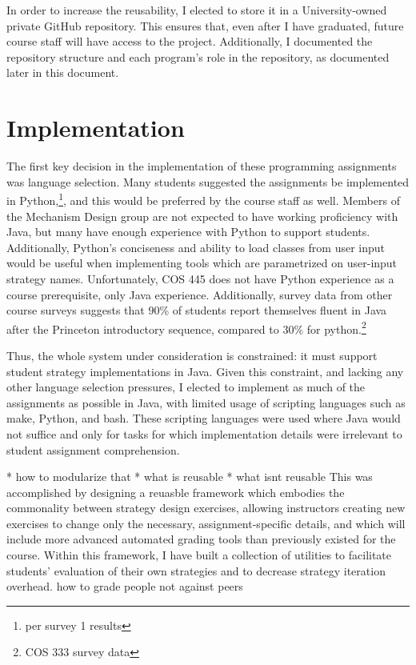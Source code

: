 \documentclass[pageno]{jpaper}
\begin{document}
In order to increase the reusability, I elected to store it in a University-owned private GitHub repository.
This ensures that, even after I have graduated, future course staff will have access to the project.
Additionally, I documented the repository structure and each program's role in the repository, as documented later in this document.

\section*{Implementation}
The first key decision in the implementation of these programming assignments was language selection.
Many students suggested the assignments be implemented in Python,\footnote{per survey 1 results}, and this would be preferred by the course staff as well.
Members of the Mechanism Design group are not expected to have working proficiency with Java, but many have enough experience with Python to support students.
Additionally, Python's conciseness and ability to load classes from user input would be useful when implementing tools which are parametrized on user-input strategy names.
Unfortunately, COS 445 does not have Python experience as a course prerequisite, only Java experience.
Additionally, survey data from other course surveys suggests that 90\% of students report themselves fluent in Java after the Princeton introductory sequence, compared to 30\% for python.\footnote{COS 333 survey data}

Thus, the whole system under consideration is constrained: it must support student strategy implementations in Java.
Given this constraint, and lacking any other language selection pressures, I elected to implement as much of the assignments as possible in Java, with limited usage of scripting languages such as make, Python, and bash.
These scripting languages were used where Java would not suffice and only for tasks for which implementation details were irrelevant to student assignment comprehension.

* how to modularize that
* what is reusable
* what isnt reusable
This was accomplished by designing a reuasble framework which embodies the commonality between strategy design exercises, allowing instructors creating new exercises to change only the necessary, assignment-specific details, and which will include more advanced automated grading tools than previously existed for the course.
Within this framework, I have built a collection of utilities to facilitate students' evaluation of their own strategies and to decrease strategy iteration overhead.
how to grade people not against peers
\end{document}
